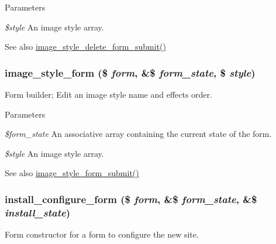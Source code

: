 \begin{DoxyParams}{Parameters}
\item[{\em \$style}]An image style array.\end{DoxyParams}
\begin{DoxySeeAlso}{See also}
\hyperlink{image_8admin_8inc_a9d81773b31a39889eaeb0acd77c72e60}{image\_\-style\_\-delete\_\-form\_\-submit()} 
\end{DoxySeeAlso}
\hypertarget{group__forms_ga4e39fcf28fa02c59163663ed6fca7d66}{
\subsubsection[{image\_\-style\_\-form}]{\setlength{\rightskip}{0pt plus 5cm}image\_\-style\_\-form (\$ {\em form}, \/  \&\$ {\em form\_\-state}, \/  \$ {\em style})}}
\label{group__forms_ga4e39fcf28fa02c59163663ed6fca7d66}
Form builder; Edit an image style name and effects order.


\begin{DoxyParams}{Parameters}
\item[{\em \$form\_\-state}]An associative array containing the current state of the form. \item[{\em \$style}]An image style array.\end{DoxyParams}
\begin{DoxySeeAlso}{See also}
\hyperlink{image_8admin_8inc_a20848bbee768081e10fc4ff75c497e02}{image\_\-style\_\-form\_\-submit()} 
\end{DoxySeeAlso}
\hypertarget{group__forms_ga38e5d79d667dbc48f40ca4238d6d161b}{
\subsubsection[{install\_\-configure\_\-form}]{\setlength{\rightskip}{0pt plus 5cm}install\_\-configure\_\-form (\$ {\em form}, \/  \&\$ {\em form\_\-state}, \/  \&\$ {\em install\_\-state})}}
\label{group__forms_ga38e5d79d667dbc48f40ca4238d6d161b}
Form constructor for a form to configure the new site.


